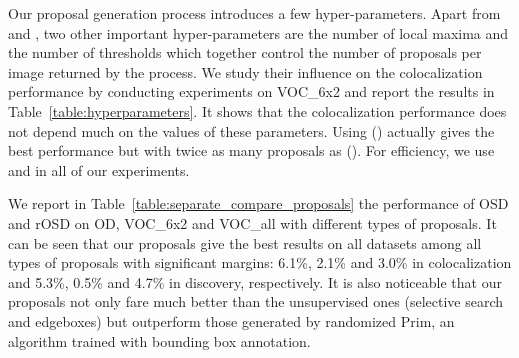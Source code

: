 \documentclass[runningheads]{llncs}
\begin{document}
Our proposal generation process introduces a few hyper-parameters. Apart from  and , two other important hyper-parameters are the number of local maxima  and the number of thresholds  which together control the number of proposals  per image returned by the process. We study their influence on the colocalization performance by conducting experiments on VOC\_6x2 and report the results in Table~\ref{table:hyperparameters}. It shows that the colocalization performance does not depend much on the values of these parameters. Using () actually gives the best performance but with twice as many proposals as (). For efficiency, we use  and  in all of our experiments.

We report in Table~\ref{table:separate_compare_proposals} the performance of OSD and rOSD on OD, VOC\_6x2 and VOC\_all with different types of proposals. It can be seen that our proposals give the best results on all datasets among all types of proposals with significant margins: 6.1\%, 2.1\% and 3.0\% in colocalization and 5.3\%, 0.5\% and 4.7\% in discovery, respectively. It is also noticeable that our proposals not only fare much better than the unsupervised ones (selective search and edgeboxes) but outperform those generated by randomized Prim, an algorithm trained with bounding box annotation.

\begin{table}[tb]
    \caption{\small Single-object colocalization and discovery performance of OSD with different types of proposals. We use VGG16 features to represent regions in these experiments}
    \label{table:separate_compare_proposals}
    \centering
\end{table}
\end{document}
